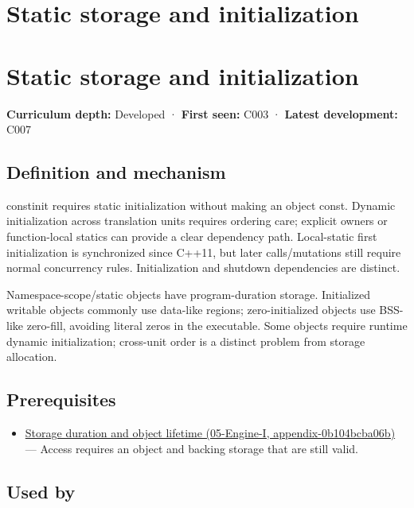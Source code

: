 \hypertarget{appendix-17c93c4c2f19}{}
\section*{Static storage and initialization}
\section{Static storage and initialization}\label{static-storage-and-initialization}

\textbf{Curriculum depth:} Developed · \textbf{First seen:} C003 · \textbf{Latest development:} C007

\subsection{Definition and mechanism}\label{definition-and-mechanism}

constinit requires static initialization without making an object const. Dynamic initialization across translation units requires ordering care; explicit owners or function-local statics can provide a clear dependency path. Local-static first initialization is synchronized since C++11, but later calls/mutations still require normal concurrency rules. Initialization and shutdown dependencies are distinct.

Namespace-scope/static objects have program-duration storage. Initialized writable objects commonly use data-like regions; zero-initialized objects use BSS-like zero-fill, avoiding literal zeros in the executable. Some objects require runtime dynamic initialization; cross-unit order is a distinct problem from storage allocation.

\subsection{Prerequisites}\label{prerequisites}

\begin{itemize}
\tightlist
\item
  \href{}{Storage duration and object lifetime (05-Engine-I, appendix-0b104bcba06b)} --- Access requires an object and backing storage that are still valid.
\end{itemize}

\subsection{Used by}\label{used-by}

